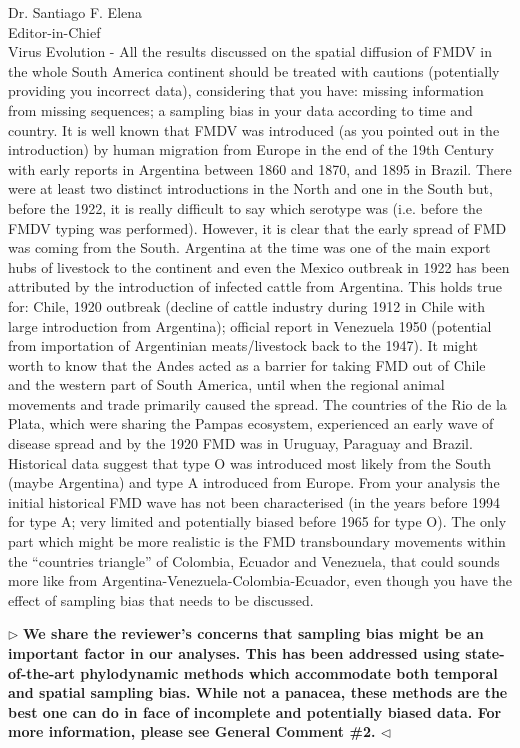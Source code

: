 \documentclass[12pt, a4paper]{letter} %
\newenvironment{reply}{$\triangleright$\bf}{$\triangleleft$}
\begin{document}
\begin{letter}{
	Dr. Santiago F. Elena\\
    Editor-in-Chief \\
    Virus Evolution
}
-       All the results discussed on the spatial diffusion of FMDV in the whole South America continent should be treated with cautions (potentially providing you incorrect data), considering that you have: missing information from missing sequences; a sampling bias in your data according to time and country. 
It is well known that FMDV was introduced (as you pointed out in the introduction) by human migration from Europe in the end of the 19th Century with early reports in Argentina between 1860 and 1870, and 1895 in Brazil. 
There were at least two distinct introductions in the North and one in the South but, before the 1922, it is really difficult to say which serotype was (i.e. before the FMDV typing was performed). 
However, it is clear that the early spread of FMD was coming from the South. 
Argentina at the time was one of the main export hubs of livestock to the continent and even the Mexico outbreak in 1922 has been attributed by the introduction of infected cattle from Argentina. 
This holds true for: Chile, 1920 outbreak (decline of cattle industry during 1912 in Chile with large introduction from Argentina); official report in Venezuela 1950 (potential from importation of Argentinian meats/livestock back to the 1947). 
It might worth to know that the Andes acted as a barrier for taking FMD out of Chile and the western part of South America, until when the regional animal movements and trade primarily caused the spread. 
The countries of the Rio de la Plata, which were sharing the Pampas ecosystem, experienced an early wave of disease spread and by the 1920 FMD was in Uruguay, Paraguay and Brazil. 
Historical data suggest that type O was introduced most likely from the South (maybe Argentina) and type A introduced from Europe. 
From your analysis the initial historical FMD wave has not been characterised (in the years before 1994 for type A; very limited and potentially biased before 1965 for type O). 
The only part which might be more realistic is the FMD transboundary movements within the ``countries triangle'' of Colombia, Ecuador and Venezuela, that could sounds more like from Argentina-Venezuela-Colombia-Ecuador, even though you have the effect of sampling bias that needs to be discussed.

\begin{reply}
We share the reviewer's concerns that sampling bias might be an important factor in our analyses.
This has been addressed using state-of-the-art phylodynamic methods which accommodate both temporal and spatial sampling bias.
While not a panacea, these methods are the best one can do in face of incomplete and potentially biased data.
For more information, please see General Comment \#2.
\end{reply}


\end{letter}
\end{document}
